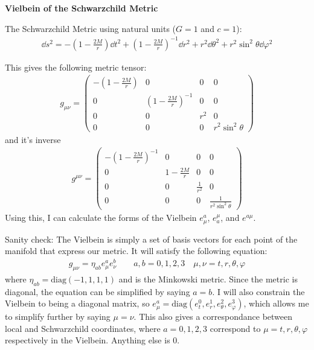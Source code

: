 \documentclass[12pt]{article}
\begin{document}
\begin{center}
  \Large\textbf{Vielbein of the Schwarzchild Metric} \\
  \large{}
\end{center}

The Schwarzchild Metric using natural units ($G = 1$ and $c = 1$):
\begin{align*}
  \dd{s}^2 = -\left(1 - \frac{2M}{r}\right)\dd{t}^2 + \left(1 - \frac{2M}{r}\right)^{-1}\dd{r}^2 + r^2\dd{\theta}^2 + r^2\sin^2{\theta}\dd{\varphi}^2
\end{align*}

This gives the following metric tensor:
\begin{align*}
  g_{\mu\nu} =
  \begin{pmatrix}
  -\left(1 - \frac{2M}{r}\right) & 0 & 0 & 0 \\
  0 & \left(1 - \frac{2M}{r}\right)^{-1} & 0 & 0 \\
  0 & 0 & r^2 & 0 \\
  0 & 0 & 0 & r^2 \sin^2{\theta}
\end{pmatrix}
\end{align*}
and it's inverse
\begin{align*}
  g^{\mu\nu} =
  \begin{pmatrix}
  -\left(1 - \frac{2M}{r}\right)^{-1} & 0 & 0 & 0 \\
  0 & 1 - \frac{2M}{r} & 0 & 0 \\
  0 & 0 & \frac{1}{r^2} & 0 \\
  0 & 0 & 0 & \frac{1}{r^2 \sin^2{\theta}}
  \end{pmatrix}
\end{align*}
Using this, I can calculate the forms of the Vielbein $e^a_\mu$, $e^\mu_a$, and $e^{a\mu}$.

Sanity check: The Vielbein is simply a set of basis vectors for each point of the manifold that express our metric. It will satisfy the following equation:
\begin{align*}
  g_{\mu\nu} = \eta_{ab}e^a_\mu e^b_\nu \qquad a,b = 0,1,2,3 \quad \mu,\nu = t,r,\theta,\varphi
\end{align*}
where $\eta_{ab} = \text{diag}(-1,1,1,1)$ and is the Minkowski metric. Since the metric is diagonal, the equation can be simplified by saying $a=b$. I will also constrain the Vielbein to being a diagonal matrix, so $e^a_\mu = \text{diag}(e^0_t,e^1_r,e^2_\theta,e^3_\varphi)$, which allows me to simplify further by saying $\mu = \nu$. This also gives a correspondance between local and Schwarzchild coordinates, where $a = 0,1,2,3$ correspond to $\mu = t,r,\theta,\varphi$ respectively in the Vielbein. Anything else is $0$.
\end{document}
